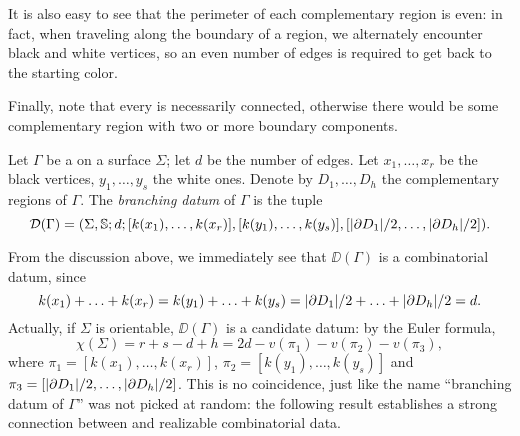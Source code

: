 It is also easy to see that the perimeter of each complementary region is even: in fact, when traveling along the boundary of a region, we alternately encounter black and white vertices, so an even number of edges is required to get back to the starting color.

Finally, note that every \dessin{} is necessarily connected, otherwise there would be some complementary region with two or more boundary components.

\begin{definition}
Let $\Gamma$ be a \dessin{} on a surface $\Sigma$; let $d$ be the number of edges. Let $x_1,\ldots,x_r$ be the black vertices, $y_1,\ldots,y_s$ the white ones. Denote by $D_1,\ldots,D_h$ the complementary regions of $\Gamma$. The \emph{branching datum} of $\Gamma$ is the tuple
\[
\mathcal{D}(\Gamma)=(\Sigma,\mathbb{S}{};d;[k(x_1),\ldots,k(x_r)],[k(y_1),\ldots,k(y_s)],[\lvert \partial D_1\rvert/2,\ldots,\lvert \partial D_h\rvert/2]).
\]
\end{definition}

From the discussion above, we immediately see that $\DD(\Gamma)$ is a combinatorial datum, since
\[
k(x_1)+\ldots+k(x_r)=k(y_1)+\ldots+k(y_s)=\lvert \partial D_1\rvert/2+\ldots+\lvert \partial D_h\rvert/2=d.
\]
Actually, if $\Sigma$ is orientable, $\DD(\Gamma)$ is a candidate datum: by the Euler formula,
\[
\chi(\Sigma)=r+s-d+h=2d-v(\pi_1)-v(\pi_2)-v(\pi_3),
\]
where $\pi_1=[k(x_1),\ldots,k(x_r)]$, $\pi_2=[k(y_1),\ldots,k(y_s)]$ and $\pi_3=[\lvert \partial D_1\rvert/2,\ldots,\lvert \partial D_h\rvert/2]$. This is no coincidence, just like the name ``branching datum of $\Gamma$'' was not picked at random: the following result establishes a strong connection between \dessins{} and realizable combinatorial data.

